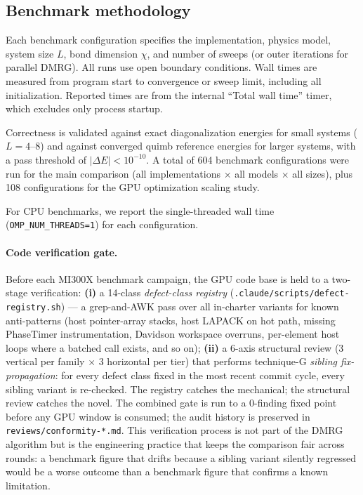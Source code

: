 \documentclass[preprint,12pt]{elsarticle}
\begin{document}
\subsection{Benchmark methodology}
\label{sec:methodology}

Each benchmark configuration specifies the implementation, physics model, system size $L$, bond dimension $\chi$, and number of sweeps (or outer iterations for parallel DMRG).
All runs use open boundary conditions.
Wall times are measured from program start to convergence or sweep limit, including all initialization.
Reported times are from the internal ``Total wall time'' timer, which excludes only process startup.

Correctness is validated against exact diagonalization energies for small systems ($L = 4$--$8$) and against converged quimb reference energies for larger systems, with a pass threshold of $|\Delta E| < 10^{-10}$.
A total of 604 benchmark configurations were run for the main comparison (all implementations $\times$ all models $\times$ all sizes), plus 108 configurations for the GPU optimization scaling study.

For CPU benchmarks, we report the single-threaded wall time (\texttt{OMP\_NUM\_THREADS=1}) for each configuration.

\paragraph{Code verification gate.}
Before each MI300X benchmark campaign, the GPU code base is held to a two-stage verification:
\textbf{(i)} a 14-class \emph{defect-class registry} (\texttt{.claude/scripts/defect-registry.sh}) — a grep-and-AWK pass over all in-charter variants for known anti-patterns (host pointer-array stacks, host LAPACK on hot path, missing PhaseTimer instrumentation, Davidson workspace overruns, per-element host loops where a batched call exists, and so on);
\textbf{(ii)} a 6-axis structural review (3 vertical per family $\times$ 3 horizontal per tier) that performs technique-G \emph{sibling fix-propagation}: for every defect class fixed in the most recent commit cycle, every sibling variant is re-checked.
The registry catches the mechanical; the structural review catches the novel.
The combined gate is run to a 0-finding fixed point before any GPU window is consumed; the audit history is preserved in \texttt{reviews/conformity-*.md}.
This verification process is not part of the DMRG algorithm but is the engineering practice that keeps the comparison fair across rounds: a benchmark figure that drifts because a sibling variant silently regressed would be a worse outcome than a benchmark figure that confirms a known limitation.
\end{document}
